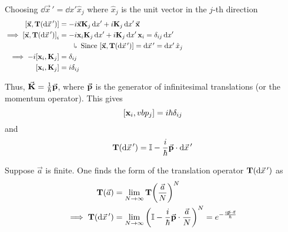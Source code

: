\documentclass[12pt,a4paper,titlepage]{article}
\newcommand{\explain}[1]{%
	\quad\rotatebox[origin=c]{180}{\enskip$\Lsh$}\hfill
	\begin{minipage}[t]{\dimexpr\linewidth-8em\relax}
	#1
	\end{minipage}\hspace{4em}\bigskip
}
\begin{document}
Choosing $\dd{\vec{x}\,'}=\dd{x'}\hat{x}_{j}$ where $\hat{x}_{j}$ is the unit vector in the $j$-th direction
\begin{equation}
\begin{aligned}
\comm{\vec{\vb{x}}}{\vb{T}(\dd{\vec{x}\,'})}&=-i\vec{\vb{x}}\vb{K}_{j}\dd{x'}+i\vb{K}_{j}\dd{x'}\vec{\vb{x}}\\
\implies\comm{\vec{\vb{x}}}{\vb{T}(\dd{\vec{x}\,'})}_{i}&=-i\vb{x}_{i}\vb{K}_{j}\dd{x'}+i\vb{K}_{j}\dd{x'}\vb{x}_{i}=\delta_{ij}\dd{x'}\\
&\quad\explain{Since $\comm{\vec{\vb{x}}}{\vb{T}(\dd{\vec{x}\,'})}=\dd{\vec{x}\,'}=\dd{x'}\hat{x}_{j}$}\\
\implies -i\comm{\vb{x}_{i}}{\vb{K}_{j}}&=\delta_{ij}\\
\comm{\vb{x}_{i}}{\vb{K}_{j}}&=i\delta_{ij}\\
\end{aligned}
\end{equation}

Thus, $\vec{\vb{K}}=\frac{1}{\hbar}\vec{\vb{p}}$, where $\vec{\vb{p}}$ is the generator of infinitesimal translations (or the momentum operator). This gives
\begin{equation}
\comm{\vb{x}_{i}}{vb{p}_{j}}=i\hbar\delta_{ij}
\end{equation}
and
\begin{equation}
\vb{T}(\dd{\vec{x}\,'})=\mathbb{I}-\frac{i}{\hbar}\vec{\vb{p}}\cdot\dd{\vec{x}\,'}
\end{equation}

Suppose $\vec{a}$ is finite. One finds the form of the translation operator $\vb{T}(\dd{\vec{x}\,'})$ as
\begin{equation}
\begin{aligned}
\vb{T}(\vec{a})&=\lim_{N\rightarrow\infty}\vb{T}\qty(\frac{\vec{a}}{N})^{N}\\
\implies\vb{T}(\dd{\vec{x}\,'})&=\lim_{N\rightarrow\infty}\qty(\mathbb{I}-\frac{i}{\hbar}\vec{\vb{p}}\cdot\frac{\vec{a}}{N})^{N}=e^{-\frac{i\vec{\vb{p}}\cdot\vec{a}}{\hbar}}
\end{aligned}
\end{equation}
\end{document}
